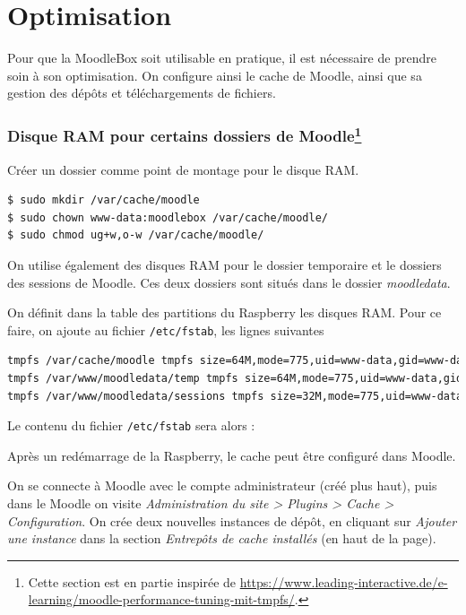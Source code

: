 \documentclass[12pt]{article}
\begin{document}
\section{Optimisation}

Pour que la MoodleBox soit utilisable en pratique, il est nécessaire de prendre soin à son optimisation.
On configure ainsi le cache de Moodle, ainsi que sa gestion des dépôts et téléchargements de fichiers.

\subsubsection[Disque RAM pour certains dossiers de Moodle]{Disque RAM pour certains dossiers de Moodle\footnote{Cette section est en partie inspirée de \url{https://www.leading-interactive.de/e-learning/moodle-performance-tuning-mit-tmpfs/}.}}

Créer un dossier comme point de montage pour le disque RAM.
\begin{lstlisting}[language=bash]
$ sudo mkdir /var/cache/moodle
$ sudo chown www-data:moodlebox /var/cache/moodle/
$ sudo chmod ug+w,o-w /var/cache/moodle/
\end{lstlisting}

On utilise également des disques RAM pour le dossier temporaire et le dossiers des sessions de Moodle.
Ces deux dossiers sont situés dans le dossier \emph{moodledata}.

On définit dans la table des partitions du Raspberry les disques RAM.
Pour ce faire, on ajoute au fichier \lstinline{/etc/fstab}, les lignes suivantes
\begin{lstlisting}[language=bash]
tmpfs /var/cache/moodle tmpfs size=64M,mode=775,uid=www-data,gid=www-data 0 0
tmpfs /var/www/moodledata/temp tmpfs size=64M,mode=775,uid=www-data,gid=www-data 0 0
tmpfs /var/www/moodledata/sessions tmpfs size=32M,mode=775,uid=www-data,gid=www-data 0 0
\end{lstlisting}

%
Le contenu du fichier \lstinline{/etc/fstab} sera alors :


Après un redémarrage de la Raspberry, le cache peut être configuré dans Moodle.

On se connecte à Moodle avec le compte administrateur (créé plus haut), puis dans le Moodle on visite \emph{Administration du site > Plugins > Cache > Configuration}.
On crée deux nouvelles instances de dépôt, en cliquant sur \emph{Ajouter une instance} dans la section \emph{Entrepôts de cache installés} (en haut de la page).
\end{document}
